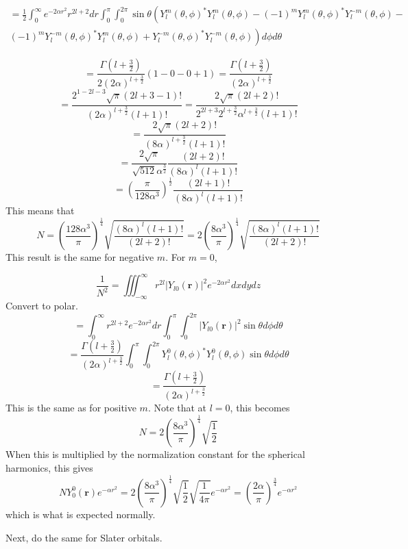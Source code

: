 \documentclass[12pt]{article}
\begin{document}
\begin{multline*}
  = \frac{1}{2} \int_0^\infty e^{-2\alpha r^2} r^{2l + 2} dr \int_0^\pi\int_0^{2\pi} \sin\theta \left(Y_l^m(\theta,\phi)^*Y_l^m(\theta,\phi) - (-1)^m Y_l^m(\theta,\phi)^* Y_{l}^{-m}(\theta,\phi) - \right.\\
  \left.(-1)^m Y_l^{-m}(\theta,\phi)^* Y_l^m(\theta,\phi) + Y_l^{-m}(\theta,\phi)^* Y_l^{-m}(\theta,\phi)\right) d\phi d\theta
\end{multline*}

$$  = \frac{\Gamma\left(l + \frac{3}{2}\right)}{2\left(2\alpha\right)^{l + \frac{3}{2}}} \left(1 - 0 - 0 + 1\right) = \frac{\Gamma\left(l + \frac{3}{2}\right)}{(2\alpha)^{l + \frac{3}{2}}}$$
$$ = \frac{2^{1 - 2l - 3}\sqrt{\pi} (2l + 3 - 1)!}{(2\alpha)^{l + \frac{3}{2}} (l + 1)!} = \frac{2\sqrt{\pi} (2l + 2)!}{2^{2l + 3} 2^{l + \frac{3}{2}} \alpha^{l + \frac{3}{2}} (l + 1)!}$$
$$ = \frac{2\sqrt{\pi}(2l + 2)!}{(8\alpha)^{l + \frac{3}{2}} (l + 1)!}$$
$$ = \frac{2\sqrt{\pi}}{\sqrt{512}\alpha^{\frac{3}{2}}}\frac{(2l + 2)!}{(8\alpha)^l (l + 1)!}$$
$$ = \left(\frac{\pi}{128\alpha^3}\right)^{\frac{1}{2}} \frac{(2l + 1)!}{(8\alpha)^l (l + 1)!}$$
This means that
$$N = \left(\frac{128\alpha^3}{\pi}\right)^{\frac{1}{4}} \sqrt{\frac{(8\alpha)^l (l + 1)!}{(2l + 2)!}} = 2\left(\frac{8\alpha^3}{\pi}\right)^{\frac{1}{4}} \sqrt{\frac{(8\alpha)^l (l + 1)!}{(2l + 2)!}}$$
This result is the same for negative $m$. For $m = 0$,

$$\frac{1}{N^2} = \iiint_{-\infty}^\infty r^{2l} \left|Y_{l0}(\mathbf{r})\right|^2 e^{-2\alpha r^2} dxdydz$$
Convert to polar.
$$= \int_0^\infty r^{2l + 2} e^{-2\alpha r^2} dr \int_0^\pi \int_0^{2\pi} \left|Y_{l0}(\mathbf{r})\right|^2 \sin\theta d\phi d\theta$$
$$ = \frac{\Gamma\left(l + \frac{3}{2}\right)}{(2\alpha)^{l + \frac{3}{2}}} \int_0^\pi \int_0^{2\pi} Y_l^0(\theta,\phi)^*Y_l^0(\theta, \phi)\sin\theta d\phi d\theta$$
$$ = \frac{\Gamma\left(l + \frac{3}{2}\right)}{(2\alpha)^{l + \frac{3}{2}}}$$
This is the same as for positive $m$.
Note that at $l = 0$, this becomes
$$N = 2\left(\frac{8\alpha^3}{\pi}\right)^{\frac{1}{4}} \sqrt{\frac{1}{2}}$$
When this is multiplied by the normalization constant for the spherical harmonics, this gives
$$NY_0^0(\mathbf{r}) e^{-\alpha r^2} = 2\left(\frac{8\alpha^3}{\pi}\right)^{\frac{1}{4}} \sqrt{\frac{1}{2}} \sqrt{\frac{1}{4\pi}} e^{-\alpha r^2}= \left(\frac{2\alpha}{\pi}\right)^{\frac{3}{4}} e^{-\alpha r^2}$$
which is what is expected normally.


Next, do the same for Slater orbitals.
\end{document}
